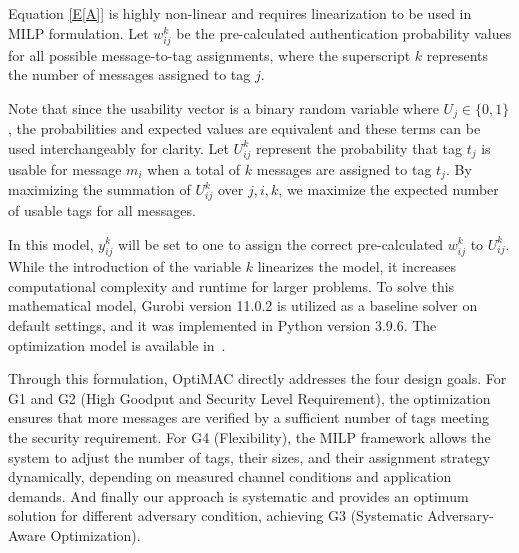 

Equation \eqref{E[A]} is highly non-linear and requires linearization to be used in MILP formulation. Let \( w^k_{ij} \) be the pre-calculated authentication probability values for all possible message-to-tag assignments, where the superscript \( k \) represents the number of messages assigned to tag \( j \). 

Note that since the usability vector is a binary random variable where \( U_j \in \{0,1\} \), the probabilities and expected values are equivalent and these terms can be used interchangeably for clarity. Let \( U^k_{ij} \) represent the probability that tag \( t_j \) is usable for message \( m_i \) when a total of \( k \) messages are assigned to tag \( t_j \). By maximizing the summation of \( U^k_{ij} \) over \( j, i, k \), we maximize the expected number of usable tags for all messages.

In this model, \( y^k_{ij} \) will be set to one to assign the correct pre-calculated \( w^k_{ij} \) to \( U^k_{ij} \). While the introduction of the variable \( k \) linearizes the model, it increases computational complexity and runtime for larger problems. To solve this mathematical model, Gurobi version 11.0.2 is utilized as a baseline solver on default settings, and it was implemented in Python version 3.9.6. The optimization model is available in~\cite{OptiMAC}.



Through this formulation, OptiMAC directly addresses the four design goals.
For G1 and G2 (High Goodput and Security Level Requirement), the optimization ensures that more messages are verified by a sufficient number of tags meeting the security requirement. For G4 (Flexibility), the MILP framework allows the system to adjust the number of tags, their sizes, and their assignment strategy dynamically, depending on measured channel conditions and application demands. And finally our approach is systematic and provides an optimum solution for different adversary condition, achieving G3 (Systematic Adversary-Aware Optimization). 

